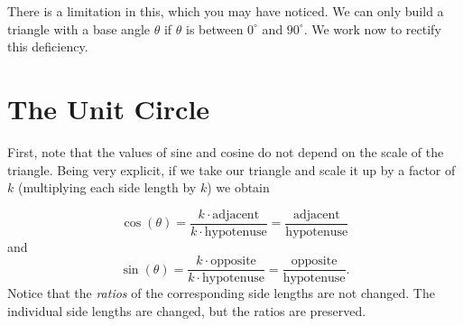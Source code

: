 \documentclass[nooutcomes]{ximera}
\begin{document}
There is a limitation in this, which you may have noticed. We can only build a triangle with a base angle $\theta$ if $\theta$ is between $0^\circ$ and $90^\circ$. We work now to rectify this deficiency.

\section{The Unit Circle}
		

First, note that the values of sine and cosine do not depend on the scale of the
triangle. Being very explicit, if we take our triangle and scale it up by a factor of $k$ (multiplying each side length by $k$) we obtain

\begin{image}[2in]
\end{image}
\[
\cos(\theta) = \frac{k\cdot\text{adjacent}}{k\cdot\text{hypotenuse}} =\frac{\text{adjacent}}{\text{hypotenuse}}
\]
and
\[
\sin(\theta) = \frac{k\cdot\text{opposite}}{k\cdot\text{hypotenuse}} = \frac{\text{opposite}}{\text{hypotenuse}}.
\]
Notice that the \emph{ratios} of the corresponding side lengths are not changed. The individual side lengths are changed, but the ratios are preserved.
\end{document}
